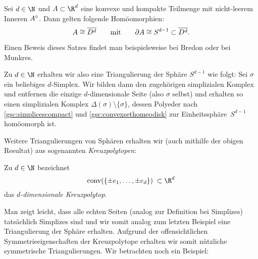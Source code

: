 \begin{thSatz}
    \label{gsc:convexsethomeodisk}
    Sei $d\in\N$ und $A\subset\R^d$ eine konvexe und kompakte Teilmenge mit
    nicht-leerem Inneren $A^\circ$. Dann gelten folgende Homöomorphien:
    \[ A\cong\overline{D^d} \qquad\text{mit}\qquad 
        \partial A \cong S^{d-1} \subset \overline{D^d} . \]
\end{thSatz}

Einen Beweis dieses Satzes findet man beispielsweise bei
Bredon\cite[Ch.\,I,.]{bookc:bredon93} oder bei
Munkres\cite[Ch.\,1,\;\S1,]{bookc:munkres84}.

\begin{thBeispiel}
    Zu $d\in\N$ erhalten wir also eine Triangulierung der Sphäre $S^{d-1}$ wie
    folgt: Sei $\sigma$ ein beliebiges $d$-Simplex. Wir bilden dann den
    zugehörigen simplizialen Komplex und entfernen die einzige $d$-dimensionale
    Seite (also $\sigma$ selbst) und erhalten so einen simplizialen Komplex
    $\Delta(\sigma)\setminus\{\sigma\}$, dessen Polyeder nach
    \cref{gsc:simplicescompact} und \cref{gsc:convexsethomeodisk} zur
    Einheitssphäre~$S^{d-1}$ homöomorph ist.
\end{thBeispiel}


Weitere Triangulierungen von Sphären erhalten wir (auch mithilfe der obigen
Resultat) aus sogenannten \emph{Kreuzpolytopen}:

\begin{thDef}[Kreuzpolytop]
    Zu $d\in\N$ bezeichnet
    \[ \conv(\{ \pm e_1, \ldots, \pm e_d \}) \;\subset\R^d \]
    das \emph{$d$-dimensionale Kreuzpolytop}.
\end{thDef}


Man zeigt leicht, dass alle echten Seiten (analog zur Definition bei Simplizes)
tatsächlich Simplizes sind und wir somit analog zum letzten Beispiel eine
Triangulierung der Sphäre erhalten. Aufgrund der offensichtlichen
Symmetrieeigenschaften der Kreuzpolytope erhalten wir somit nützliche symmetrische
Triangulierungen. Wir betrachten noch ein Beispiel:

